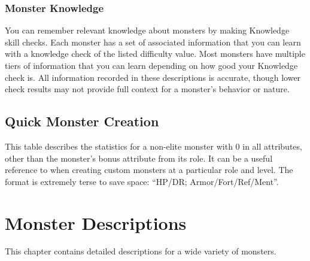     \subsection{Monster Knowledge}
        You can remember relevant knowledge about monsters by making Knowledge skill checks.
        Each monster has a set of associated information that you can learn with a knowledge check of the listed difficulty value.
        Most monsters have multiple tiers of information that you can learn depending on how good your Knowledge check is.
        All information recorded in these descriptions is accurate, though lower check results may not provide full context for a monster's behavior or nature.

\section{Quick Monster Creation}

    This table describes the statistics for a non-elite monster with 0 in all attributes, other than the monster's bonus attribute from its role.
    It can be a useful reference to when creating custom monsters at a particular role and level.
    The format is extremely terse to save space: ``HP/DR; Armor/Fort/Ref/Ment''.

    

\chapter{Monster Descriptions}

This chapter contains detailed descriptions for a wide variety of monsters.



